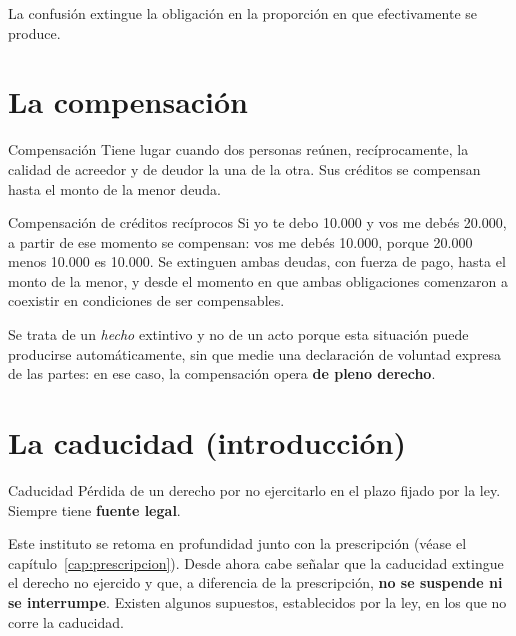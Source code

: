 \documentclass[12pt,oneside]{book}
\begin{document}
La confusión extingue la obligación en la proporción en que efectivamente se produce.

\section{La compensación}

\begin{definition}{Compensación}
Tiene lugar cuando dos personas reúnen, recíprocamente, la calidad de acreedor y de deudor la una de la otra. Sus créditos se compensan hasta el monto de la menor deuda.
\end{definition}

\begin{example}{Compensación de créditos recíprocos}
Si yo te debo 10.000 y vos me debés 20.000, a partir de ese momento se compensan: vos me debés 10.000, porque 20.000 menos 10.000 es 10.000. Se extinguen ambas deudas, con fuerza de pago, hasta el monto de la menor, y desde el momento en que ambas obligaciones comenzaron a coexistir en condiciones de ser compensables.
\end{example}

Se trata de un \textit{hecho} extintivo y no de un acto porque esta situación puede producirse automáticamente, sin que medie una declaración de voluntad expresa de las partes: en ese caso, la compensación opera \textbf{de pleno derecho}.

\section{La caducidad (introducción)}

\begin{definition}{Caducidad}
Pérdida de un derecho por no ejercitarlo en el plazo fijado por la ley. Siempre tiene \textbf{fuente legal}.
\end{definition}

Este instituto se retoma en profundidad junto con la prescripción (véase el capítulo~\ref{cap:prescripcion}). Desde ahora cabe señalar que la caducidad extingue el derecho no ejercido y que, a diferencia de la prescripción, \textbf{no se suspende ni se interrumpe}. Existen algunos supuestos, establecidos por la ley, en los que no corre la caducidad.
\end{document}
